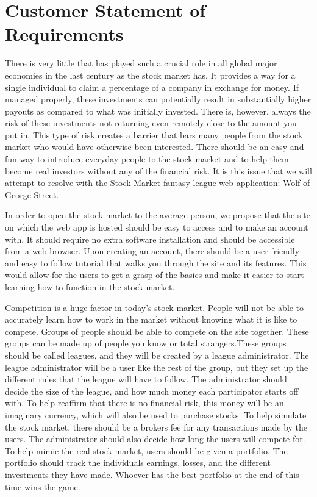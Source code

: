 \documentclass[11pt,letterpaper,oneside]{memoir}
\begin{document}
\chapter{Customer Statement of Requirements}
\setlength{\parindent}{2em}
There is very little that has played such a crucial role in all global major economies in the last century as the stock market has. It provides a way for a single individual to claim a percentage of a company in exchange for money. If managed properly, these investments can potentially result in substantially higher payouts as compared to what was initially invested. There is, however, always the risk of these investments not returning even remotely close to the amount you put in. This type of risk creates a barrier that bars many people from the stock market who would have otherwise been interested. There should be an easy and fun way to introduce everyday people to the stock market and to help them become real investors without any of the financial risk. It is this issue that we will attempt to resolve with the Stock-Market fantasy league web application: Wolf of George Street. \par
 In order to open the stock market to the average person, we propose that the site on which the web app is hosted should be easy to access and to make an account with. It should require no extra software installation and should be accessible from a web browser. Upon creating an account, there should be a user friendly and easy to follow tutorial that walks you through the site and its features. This would allow for the users to get a grasp of the basics and make it easier to start learning how to function in the stock market. \par
  Competition is a huge factor in today's stock market. People will not be able to accurately learn how to work in the market without knowing what it is like to compete. Groups of people should be able to compete on the site together. These groups can be made up of people you know or total strangers.These groups should be called leagues, and they will be created by a league administrator. The league administrator will be a user like the rest of the group, but they set up the different rules that the league will have to follow. The administrator should decide the size of the league, and how much money each participator starts off with. To help reaffirm that there is no financial risk, this money will be an imaginary currency, which will also be used to purchase stocks. To help simulate the stock market, there should be a brokers fee for any transactions made by the users. The administrator should also decide how long the users will compete for. To help mimic the real stock market, users should be given a portfolio. The portfolio should track the individuals earnings, losses, and the different investments they have made. Whoever has the best portfolio at the end of this time wins the game.  \par
\end{document}
